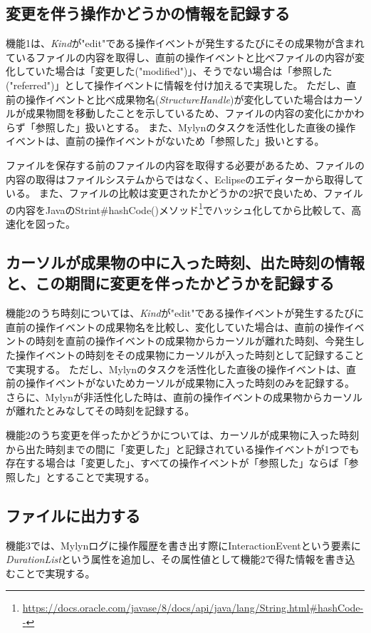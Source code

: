 \documentclass[a4paper]{jsbook}
\begin{document}
\subsection{変更を伴う操作かどうかの情報を記録する}
機能1は、{\it Kind}が"edit"である操作イベントが発生するたびにその成果物が含まれているファイルの内容を取得し、直前の操作イベントと比べファイルの内容が変化していた場合は「変更した("modified")」、そうでない場合は「参照した("referred")」として操作イベントに情報を付け加えるで実現した。
ただし、直前の操作イベントと比べ成果物名({\it StructureHandle})が変化していた場合はカーソルが成果物間を移動したことを示しているため、ファイルの内容の変化にかかわらず「参照した」扱いとする。
また、Mylynのタスクを活性化した直後の操作イベントは、直前の操作イベントがないため「参照した」扱いとする。

ファイルを保存する前のファイルの内容を取得する必要があるため、ファイルの内容の取得はファイルシステムからではなく、Eclipseのエディターから取得している。
また、ファイルの比較は変更されたかどうかの2択で良いため、ファイルの内容をJavaのStrint\#hashCode()メソッド\footnote{\url{https://docs.oracle.com/javase/8/docs/api/java/lang/String.html\#hashCode--}}でハッシュ化してから比較して、高速化を図った。

\subsection{カーソルが成果物の中に入った時刻、出た時刻の情報と、この期間に変更を伴ったかどうかを記録する}
機能2のうち時刻については、{\it Kind}が"edit"である操作イベントが発生するたびに直前の操作イベントの成果物名を比較し、変化していた場合は、直前の操作イベントの時刻を直前の操作イベントの成果物からカーソルが離れた時刻、今発生した操作イベントの時刻をその成果物にカーソルが入った時刻として記録することで実現する。
ただし、Mylynのタスクを活性化した直後の操作イベントは、直前の操作イベントがないためカーソルが成果物に入った時刻のみを記録する。
さらに、Mylynが非活性化した時は、直前の操作イベントの成果物からカーソルが離れたとみなしてその時刻を記録する。

機能2のうち変更を伴ったかどうかについては、カーソルが成果物に入った時刻から出た時刻までの間に「変更した」と記録されている操作イベントが1つでも存在する場合は「変更した」、すべての操作イベントが「参照した」ならば「参照した」とすることで実現する。

\subsection{ファイルに出力する}
機能3では、Mylynログに操作履歴を書き出す際にInteractionEventという要素に{\it DurationList}という属性を追加し、その属性値として機能2で得た情報を書き込むことで実現する。
\end{document}
